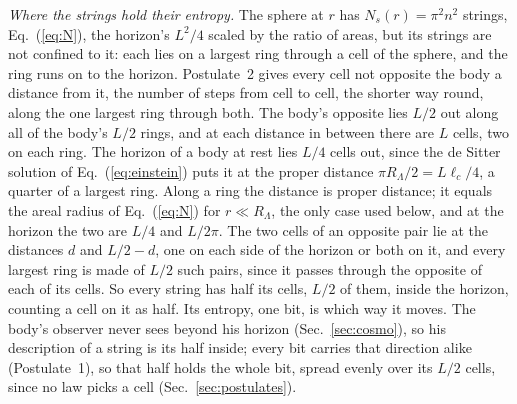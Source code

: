 \documentclass[aps,prd,twocolumn,superscriptaddress,nofootinbib,showkeys]{revtex4-2}
\newcommand{\lc}{\ell_c}
\newcommand{\RL}{R_\Lambda}
\begin{document}
\textit{Where the strings hold their entropy.} The sphere at $r$ has $N_s(r) = \pi^2n^2$ strings, Eq.~(\ref{eq:N}), the horizon's $L^2/4$ scaled by the ratio of areas, but its strings are not confined to it: each lies on a largest ring through a cell of the sphere, and the ring runs on to the horizon. Postulate~2 gives every cell not opposite the body a distance from it, the number of steps from cell to cell, the shorter way round, along the one largest ring through both. The body's opposite lies $L/2$ out along all of the body's $L/2$ rings, and at each distance in between there are $L$ cells, two on each ring. The horizon of a body at rest lies $L/4$ cells out, since the de Sitter solution of Eq.~(\ref{eq:einstein}) puts it at the proper distance $\pi\RL/2 = L\lc/4$, a quarter of a largest ring. Along a ring the distance is proper distance; it equals the areal radius of Eq.~(\ref{eq:N}) for $r\ll\RL$, the only case used below, and at the horizon the two are $L/4$ and $L/2\pi$. The two cells of an opposite pair lie at the distances $d$ and $L/2 - d$, one on each side of the horizon or both on it, and every largest ring is made of $L/2$ such pairs, since it passes through the opposite of each of its cells. So every string has half its cells, $L/2$ of them, inside the horizon, counting a cell on it as half. Its entropy, one bit, is which way it moves. The body's observer never sees beyond his horizon (Sec.~\ref{sec:cosmo}), so his description of a string is its half inside; every bit carries that direction alike (Postulate~1), so that half holds the whole bit, spread evenly over its $L/2$ cells, since no law picks a cell (Sec.~\ref{sec:postulates}).
\end{document}
